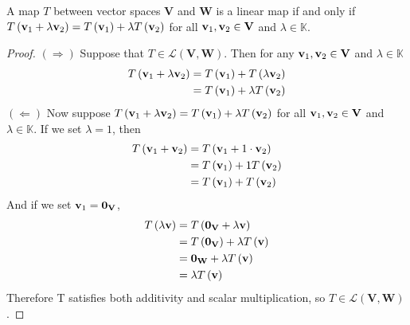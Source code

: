 \begin{lemma}\label{thm:easy-linear-map-test}
    A map \( T \) between vector spaces \( \mathbf{V} \) and \( \mathbf{W} \) is a linear map if and only if 
    \( T \left( \vb{v}_{1} + \lambda \vb{v}_{2} \right) = T \left( \vb{v}_{1} \right)+ \lambda T \left( \vb{v}_{2} \right) \) for all \( \vb{v}_{1}, \vb{v}_{2} \in \mathbf{V} \) and \( \lambda \in \mathbb{K} \).
\end{lemma}
\begin{proof}
\( \left( \Rightarrow \right) \) Suppose that \( T \in \mathcal{L} \left( \mathbf{V}, \mathbf{W} \right) \). Then for any \( \vb{v}_{1}, \vb{v}_{2} \in \mathbf{V} \) and \( \lambda \in \mathbb{K} \)
    \begin{align*}
        T \left( \vb{v}_{1} + \lambda \vb{v}_{2} \right) &= T \left( \vb{v}_{1} \right) + T \left( \lambda \vb{v}_{2} \right) \\
        &= T \left( \vb{v}_{1} \right) + \lambda T \left(  \vb{v}_{2} \right)
    \end{align*}
    \( \left(  \Leftarrow \right) \) Now suppose \( T \left( \vb{v}_{1} + \lambda \vb{v}_{2} \right) = T \left( \vb{v}_{1} \right)+ \lambda T \left( \vb{v}_{2} \right) \) for all \( \vb{v}_{1}, \vb{v}_{2} \in \mathbf{V} \) and \( \lambda \in \mathbb{K} \). If we set \( \lambda =1 \), then 
    \begin{align*}
        T \left(  \vb{v}_{1} + \vb{v}_{2} \right) &= T \left( \vb{v}_{1} + 1 \cdot \vb{v}_{2} \right)\\
         &= T \left( \vb{v}_{1} \right) + 1 T \left( \vb{v}_{2} \right)\\ 
        &= T \left( \vb{v}_{1} \right) + T \left( \vb{v}_{2} \right)
    \end{align*}
    And if we set \( \vb{v}_{1} = \vb{0}_{\mathbf{V}} \), 
    \begin{align*}
        T \left( \lambda \vb{v}\right) &= T \left(  \vb{0}_{\mathbf{V}}+ \lambda \vb{v}\right) \\
        &= T \left( \vb{0}_{\mathbf{V}} \right) + \lambda T \left( \vb{v} \right) \\
        &= \vb{0}_{\mathbf{W}} +  \lambda T \left( \vb{v} \right)  \\
        &=  \lambda T \left( \vb{v} \right) 
    \end{align*}
    Therefore T satisfies both additivity and scalar multiplication, so \( T \in \mathcal{L} \left( \mathbf{V}, \mathbf{W} \right) \).
\end{proof}

